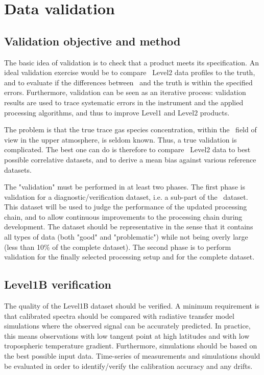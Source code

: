 \chapter{Data validation}
\label{validation}

\section{Validation objective and method}

The basic idea of validation is to check that a product  
meets its specification. An ideal validation exercise
would be to compare \smr\ Level2 data profiles to the truth,
and to evaluate if the differences between \smr\ and the 
truth is within the specified errors. Furthermore, validation can 
be seen as an iterative process: validation results are used to 
trace systematic errors in the instrument and the applied 
processing algorithms, and thus to improve Level1 and Level2 products.

The problem is that the true trace gas species concentration,
within the \smr\ field of view in the upper atmosphere, is seldom known. 
Thus, a true validation is complicated. The best one can do is therefore
to compare \smr\ Level2 data to best possible correlative datasets,
and to derive a mean bias against various reference datasets.

The "validation" must be performed in at least two phases.
The first phase is validation for a diagnostic/verification dataset, i.e. a
sub-part of the \smr\ dataset. This dataset will be used to judge the
performance of the updated processing chain, and to allow continuous
improvements to the processing chain during development.
The dataset should be representative in the sense that it
contains all types of data (both "good" and "problematic") while
not being overly large (less than 10\% of the complete dataset).
The second phase is to perform validation for the finally selected processing
setup and for the complete dataset.


\section{Level1B verification}

The quality of the Level1B dataset should be verified.
A minimum requirement is that calibrated spectra should 
be compared with radiative transfer model simulations where 
the observed signal can be accurately predicted. 
In practice, this means observations with low tangent point 
at high latitudes and with low tropospheric temperature gradient. 
Furthermore, simulations should be based on the best possible input data.
Time-series of measurements and simulations should be evaluated
in order to identify/verify the calibration accuracy and any drifts. 


